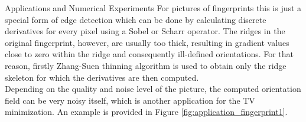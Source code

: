 \begin{chapter}{Applications and Numerical Experiments}
For pictures of fingerprints this is just a special form of edge detection which can be done by calculating discrete derivatives for every pixel using a Sobel or Scharr operator. The ridges in the original fingerprint, however, are usually too thick, resulting in gradient values close to zero within the ridge and
consequently ill-defined orientations. For that reason, firstly Zhang-Suen thinning algorithm \cite{zhangsuen} is used to obtain only the ridge skeleton for which the derivatives are then computed.\\

Depending on the quality and noise level of the picture, the computed orientation field can be very noisy itself, which is another application
for the TV minimization. An example is provided in Figure \ref{fig:application_fingerprint1}. 


\end{chapter}
